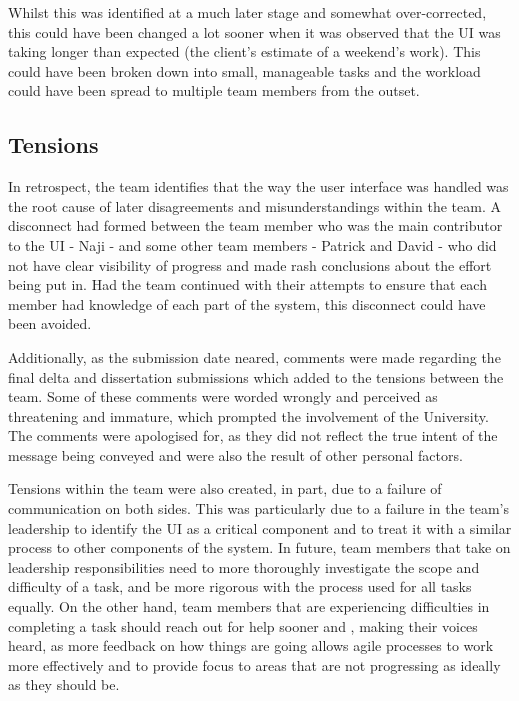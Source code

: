 \documentclass{l3proj}
\begin{document}
Whilst this was identified at a much later stage and somewhat over-corrected, this could have been changed a lot sooner when it was observed that the UI was taking longer than expected (the client's estimate of a weekend's work). This could have been broken down into small, manageable tasks and the workload could have been spread to multiple team members from the outset.

\subsection{Tensions}
In retrospect, the team identifies that the way the user interface was handled was the root cause of later disagreements and misunderstandings within the team. A disconnect had formed between the team member who was the main contributor to the UI - Naji - and some other team members - Patrick and David - who did not have clear visibility of progress and made rash conclusions about the effort being put in. Had the team continued with their attempts to ensure that each member had knowledge of each part of the system, this disconnect could have been avoided.

Additionally, as the submission date neared, comments were made regarding the final delta and dissertation submissions which added to the tensions between the team. Some of these comments were worded wrongly and perceived as threatening and immature, which prompted the involvement of the University. The comments were apologised for, as they did not reflect the true intent of the message being conveyed and were also the result of other personal factors.

Tensions within the team were also created, in part, due to a failure of communication on both sides. This was particularly due to a failure in the team's leadership to identify the UI as a critical component and to treat it with a similar process to other components of the system. In future, team members that take on leadership responsibilities need to more thoroughly investigate the scope and difficulty of a task, and be more rigorous with the process used for all tasks equally. On the other hand, team members that are experiencing difficulties in completing a task should reach out for help sooner and , making their voices heard, as more feedback on how things are going allows agile processes to work more effectively and to provide focus to areas that are not progressing as ideally as they should be.

\end{document}
